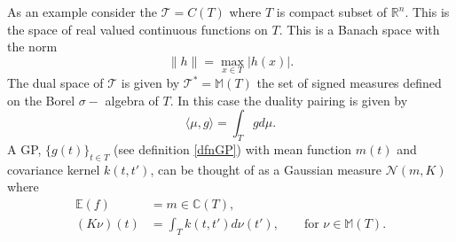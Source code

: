 \documentclass[12pt]{book}
\newcommand{\E}{\mathbb{E}} %
\newcommand{\tvs}{\mathscr{T}} %
\begin{document}
As an example consider the  $\tvs=C(T)$ where 
$T$ is compact subset of $\mathbb{R}^{n}$. This is the  space of real valued continuous functions 
on
$T$. This  is a Banach
space with the norm \cite{bressan1900lecture}
\begin{equation*}
\|h\|=\max_{x\in T}|h(x)|.
\end{equation*}
The dual space of $\tvs$ is given by $\tvs^{*}=\mathbb{M}(T)$ the set of signed measures defined on 
the Borel $\sigma-$ algebra of  $T$. In this 
case the duality pairing is given by 
\begin{equation*}
\langle\mu,g \rangle=\int_{T}gd\mu.
\end{equation*}
A GP,  $\{g(t)\}_{t\in T}$ (see definition \ref{dfnGP}) with mean function $m(t)$ and 
covariance kernel $k(t,t')$, can be thought of as a Gaussian measure $\mathcal{N}(m,K)$
where
\cite{lifshits2012lectures} 
\begin{align*}
\E(f)&=m\in\mathbb{C}(T), \\
(K\nu)(t)&=\int_{T}k(t,t')d\nu(t'),\qquad\text{for }\nu\in\mathbb{M}(T).
\end{align*}
\end{document}
